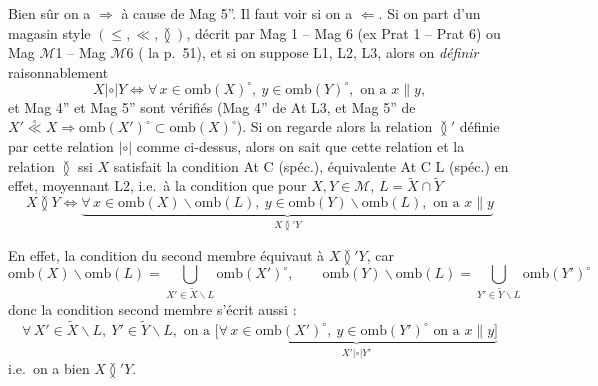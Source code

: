 \documentclass[11pt,a4paper]{article}
\begin{document}
Bien sûr on a $\Longrightarrow$ à cause de Mag 5''. Il faut voir si on a $\Longleftarrow$. Si on part d'un magasin style $(\leq, \ll, \between)$, décrit par Mag 1 -- Mag 6 (ex Prat 1 -- Prat 6) ou Mag $\mathcal{M}$1 -- Mag $\mathcal{M}$6 (\ill{} la p.~51), et si on suppose \ill{} L1, L2, L3, alors on  \emph{définir} raisonnablement
\[
  X \mathrel{|{\circ}|} Y \Longleftrightarrow \forall\, x \in \mathrm{omb}(X)^{\circ},\ y \in \mathrm{omb}(Y)^{\circ}, \text{ on a } x \parallel y,
\]
et Mag 4'' et Mag 5'' sont vérifiés (Mag 4''  de At L3, et Mag 5''  de $X' \mathrel{\overset{\circ}{\ll}} X \Rightarrow \mathrm{omb}(X')^{\circ} \subset \mathrm{omb}(X)^{\circ}$).
Si on regarde alors la relation $\between'$ définie par cette relation $\mathrel{|{\circ}|}$ comme ci-dessus, alors on sait que cette relation et la relation $\between$ \ill{} ssi $X$ satisfait la condition At C (spéc.), équivalente  At C L (spéc.) en effet, moyennant L2, i.e.\ à la condition que pour $X, Y \in \mathcal{M}$, $L = \widetilde{X} \cap \widetilde{Y}$
\[
  X \between Y \Longleftrightarrow \underbrace{\forall\, x \in \mathrm{omb}(X) \smallsetminus \mathrm{omb}(L),\ y \in \mathrm{omb}(Y) \smallsetminus \mathrm{omb}(L), \text{ on a } x \parallel y}_{X \between' Y}
\]

En effet, la condition du second membre \ill{} équivaut à $X \between' Y$, car
\[
  \mathrm{omb}(X) \smallsetminus \mathrm{omb}(L) = \bigcup_{X' \in \widetilde{X} \smallsetminus L} \mathrm{omb}(X')^{\circ}, \qquad
  \mathrm{omb}(Y) \smallsetminus \mathrm{omb}(L) = \bigcup_{Y' \in \widetilde{Y} \smallsetminus L} \mathrm{omb}(Y')^{\circ}
\]
donc la condition  second membre s'écrit aussi :
\[
  \forall\, X' \in \widetilde{X} \smallsetminus L,\ Y' \in \widetilde{Y} \smallsetminus L, \text{ on a } \underbrace{\bigl[\forall\, x \in \mathrm{omb}(X')^{\circ},\ y \in \mathrm{omb}(Y')^{\circ} \text{ on a } x \parallel y\bigr]}_{X' \mathrel{|{\circ}|} Y'}
\]
i.e.\ on a bien $X \between' Y$.
\end{document}
